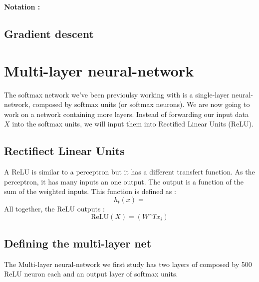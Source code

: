 		\vspace{1em}
		\textbf{Notation : }\\


	\subsection{Gradient descent}

	\section{Multi-layer neural-network}
		The softmax network we've been previoulsy working with is a single-layer  neural-network, composed by softmax units (or softmax neurons). We are now going to work on a network containing more layers. Instead of forwarding our input data $X$ into the softmax units, we will input them into Rectified Linear Units (ReLU).

		\subsection{Rectifiect Linear Units}
		A ReLU is similar to a perceptron but it has a different transfert function. As the perceptron, it has many inputs an one output. The output is a function of the sum of the weighted inputs. This function is defined as :
		$$ h_t(x) =  $$
		All together, the ReLU outputs :
		$$ \text{ReLU}(X) =  (WˆTx_i) $$

		\subsection{Defining the multi-layer net}
		The Multi-layer neural-network we first study has two layers of composed by 500 ReLU neuron each and an output layer of softmax units. 